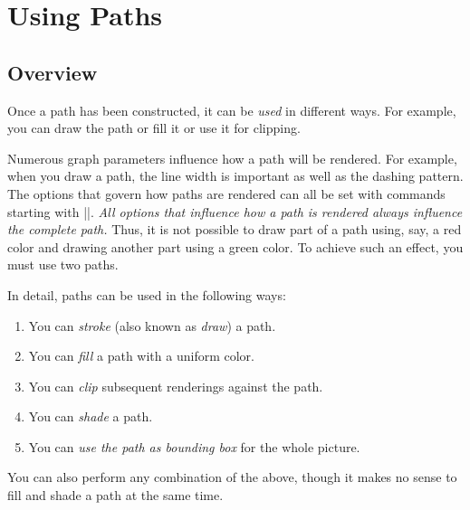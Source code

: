 %


\section{Using Paths}

\subsection{Overview}

Once a path has been constructed, it can be \emph{used} in different
ways. For example, you can draw the path or fill it or use it for
clipping.

Numerous graph parameters influence how a path will be rendered. For
example, when you draw a path, the line width is important as well as
the dashing pattern. The options that govern how paths are rendered
can all be set with commands starting with |\pgfset|. \emph{All
  options that influence how a path is rendered always influence the
  complete path.} Thus, it is not possible to draw part of a path
using, say, a red color and drawing another part using a green
color. To achieve such an effect, you must use two paths.

In detail, paths can be used in the following ways:

\begin{enumerate}
\item
  You can \emph{stroke} (also known as \emph{draw}) a path.
\item
  You can \emph{fill} a path with a uniform color.
\item
  You can \emph{clip} subsequent renderings against the path.
\item
  You can \emph{shade} a path.
\item
  You can \emph{use the path as bounding box} for the whole picture.
\end{enumerate}
You can also perform any combination of the above, though it makes no
sense to fill and shade a path at the same time.

